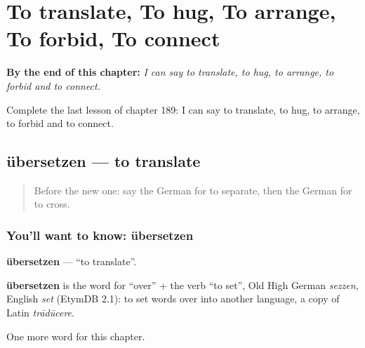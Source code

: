 
\chapter{To translate, To hug, To arrange, To forbid, To connect}
\label{ch:ge-to-translate-to-hug-to-arrange-to-forbid-to-connect}

\begin{chapteropening}
\textbf{By the end of this chapter:} \emph{I can say to translate, to hug, to arrange, to forbid and to connect.}

Complete the last lesson of chapter 189: I can say to translate, to hug, to arrange, to forbid and to connect.
\end{chapteropening}

\section[übersetzen]{übersetzen — to translate}

\label{lesson:GE-C189-uebersetzen}



\begin{quote}
Before the new one: say the German for to separate, then the German for to cross.
\end{quote}

\subsection*{You'll want to know: übersetzen}
\textbf{übersetzen} — \textquotedblleft{}to translate\textquotedblright{}.

\begin{cousinweb}
\textbf{übersetzen} is the word for \textquotedblleft{}over\textquotedblright{} + the verb \textquotedblleft{}to set\textquotedblright{}, Old High German \emph{sezzen}, English \emph{set} (EtymDB 2.1): to set words over into another language, a copy of Latin \emph{trādūcere}.
\end{cousinweb}

\begin{grammarlens}[title={What you've built}]
One more word for this chapter.
\end{grammarlens}

